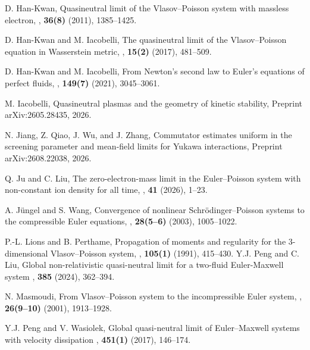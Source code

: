\documentclass[11pt,reqno]{amsart}
\numberwithin{equation}{section}
\begin{document}
\begin{thebibliography}{}
D. Han-Kwan,
\newblock Quasineutral limit of the Vlasov--Poisson system with massless electron,
, {\bf 36(8)} (2011), 1385--1425.

D. Han-Kwan and M. Iacobelli,
\newblock The quasineutral limit of the Vlasov--Poisson equation in Wasserstein metric,
, {\bf 15(2)} (2017), 481--509.

D. Han-Kwan and M. Iacobelli,
\newblock From Newton's second law to Euler's equations of perfect fluids,
, {\bf 149(7)} (2021), 3045--3061.

M. Iacobelli,
\newblock Quasineutral plasmas and the geometry of kinetic stability,
\newblock Preprint arXiv:2605.28435, 2026.

N. Jiang, Z. Qiao, J. Wu, and J. Zhang,
\newblock Commutator estimates uniform in the screening parameter
and mean-field limits for Yukawa interactions,
\newblock Preprint arXiv:2608.22038, 2026.

Q. Ju and C. Liu,
\newblock The zero-electron-mass limit in the Euler--Poisson system
with non-constant ion density for all time,
,
{\bf 41} (2026), 1--23.

A. J{\"u}ngel and S. Wang,
\newblock Convergence of nonlinear Schr{\"o}dinger--Poisson systems to the compressible Euler equations,
, {\bf 28(5--6)} (2003), 1005--1022.

P.-L. Lions and B. Perthame,
\newblock Propagation of moments and regularity for the 3-dimensional Vlasov--Poisson system,
, {\bf 105(1)} (1991), 415--430.
 Y.J. Peng and  
C. Liu, 
\newblock
Global non-relativistic quasi-neutral limit for a two-fluid Euler-Maxwell system
, {\bf 385} (2024), 362--394.

N. Masmoudi,
\newblock From Vlasov--Poisson system to the incompressible
Euler system,
,
{\bf 26(9--10)} (2001), 1913--1928.

 Y.J. Peng and V. Wasiolek, 
\newblock
Global quasi-neutral limit of Euler–Maxwell systems with velocity dissipation
, {\bf 451(1)} (2017), 146--174.


\end{thebibliography}
\end{document}
